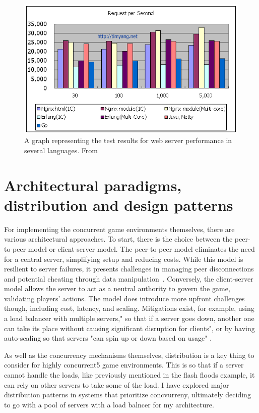 \documentclass[]{final}
\begin{document}
\begin{figure}[ht!]
  \centering
  \includegraphics[width=\linewidth]{c_erlang_java_go}
  \vspace*{-0.5cm}
  \caption{A graph representing the test results for web server performance in several languages. From \cite{yang_c_nodate}}
  \label{fig: 1}
\end{figure}


\chapter{Architectural paradigms, distribution and design patterns}

For implementing the concurrent game environments themselves, there are various architectural approaches.
To start, there is the choice between the peer-to-peer model or client-server model.
The peer-to-peer model eliminates the need for a central server, simplifying setup and
reducing costs. While this model is resilient to server failures, it presents challenges
in managing peer disconnections and potential cheating through data manipulation~\cite{franchetti_coping_2020}.
Conversely, the client-server model allows the server to act as a neutral authority to govern the game,
validating players' actions. The model does introduce more upfront challenges though, including cost,
latency, and scaling. Mitigations exist, for example, using a load balancer with multiple servers," so
that if a server goes down, another one can take its place without causing significant
disruption for clients", or by having auto-scaling so that servers "can spin up or down
based on usage" \cite{pandey_peer--peer_2022}.

As well as the concurrency mechanisms themselves, distribution is a key
thing to consider for highly concurrent5 game environments. This is so that
if a server cannot handle the loads, like previously mentioned in the flash
floods example, it can rely on other servers to take some of the load.
I have explored major distribution patterns in systems that prioritize
concvurreny, ultimately deciding to go with a pool of servers with a load
balncer for my architecture.
\end{document}
